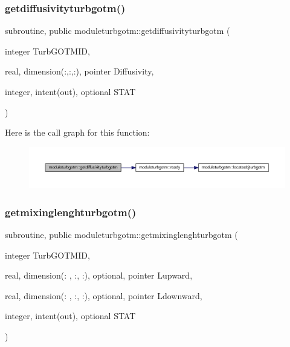 \subsubsection{\texorpdfstring{getdiffusivityturbgotm()}{getdiffusivityturbgotm()}}
{\footnotesize\ttfamily subroutine, public moduleturbgotm\+::getdiffusivityturbgotm (\begin{DoxyParamCaption}\item[{integer}]{Turb\+G\+O\+T\+M\+ID,  }\item[{real, dimension(\+:,\+:,\+:), pointer}]{Diffusivity,  }\item[{integer, intent(out), optional}]{S\+T\+AT }\end{DoxyParamCaption})}

Here is the call graph for this function\+:\nopagebreak
\begin{figure}[H]
\begin{center}
\leavevmode
\includegraphics[width=350pt]{namespacemoduleturbgotm_a44eb11a0b54701f863dfae9be213de0e_cgraph}
\end{center}
\end{figure}
\mbox{\label{namespacemoduleturbgotm_a6d3261fc0b6cba6819262e7f8ce2b140}} 
\subsubsection{\texorpdfstring{getmixinglenghturbgotm()}{getmixinglenghturbgotm()}}
{\footnotesize\ttfamily subroutine, public moduleturbgotm\+::getmixinglenghturbgotm (\begin{DoxyParamCaption}\item[{integer}]{Turb\+G\+O\+T\+M\+ID,  }\item[{real, dimension(\+: , \+:, \+:), optional, pointer}]{Lupward,  }\item[{real, dimension(\+: , \+:, \+:), optional, pointer}]{Ldownward,  }\item[{integer, intent(out), optional}]{S\+T\+AT }\end{DoxyParamCaption})}

